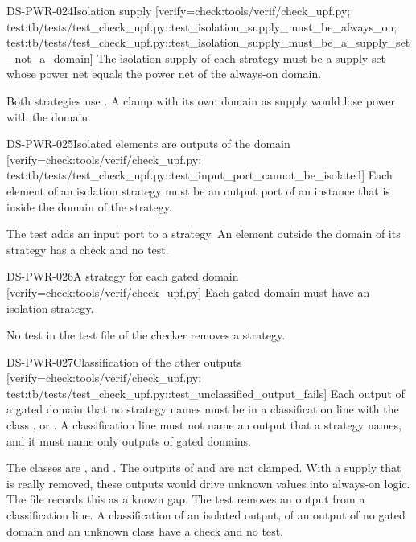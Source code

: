 \begin{requirement}{DS-PWR-024}{Isolation supply}
[verify={check:tools/verif/check_upf.py; test:tb/tests/test_check_upf.py::test_isolation_supply_must_be_always_on; test:tb/tests/test_check_upf.py::test_isolation_supply_must_be_a_supply_set_not_a_domain}]
The isolation supply of each strategy must be a supply set whose power net equals the power net of the always-on domain.
\end{requirement}
\begin{information}
Both strategies use . A clamp with its own domain as supply would lose power with the domain.
\end{information}

\begin{requirement}{DS-PWR-025}{Isolated elements are outputs of the domain}
[verify={check:tools/verif/check_upf.py; test:tb/tests/test_check_upf.py::test_input_port_cannot_be_isolated}]
Each element of an isolation strategy must be an output port of an instance that is inside the domain of the strategy.
\end{requirement}
\begin{information}
The test adds an input port to a strategy. An element outside the domain of its strategy has a check and no test.
\end{information}

\begin{requirement}{DS-PWR-026}{A strategy for each gated domain}
[verify={check:tools/verif/check_upf.py}]
Each gated domain must have an isolation strategy.
\end{requirement}
\begin{information}
No test in the test file of the checker removes a strategy.
\end{information}

\begin{requirement}{DS-PWR-027}{Classification of the other outputs}
[verify={check:tools/verif/check_upf.py; test:tb/tests/test_check_upf.py::test_unclassified_output_fails}]
Each output of a gated domain that no strategy names must be in a classification line with the class ,  or . A classification line must not name an output that a strategy names, and it must name only outputs of gated domains.
\end{requirement}
\begin{information}
The classes are ,  and . The  outputs of  and  are not clamped. With a supply that is really removed, these outputs would drive unknown values into always-on logic. The file records this as a known gap. The test removes an output from a classification line. A classification of an isolated output, of an output of no gated domain and an unknown class have a check and no test.
\end{information}

